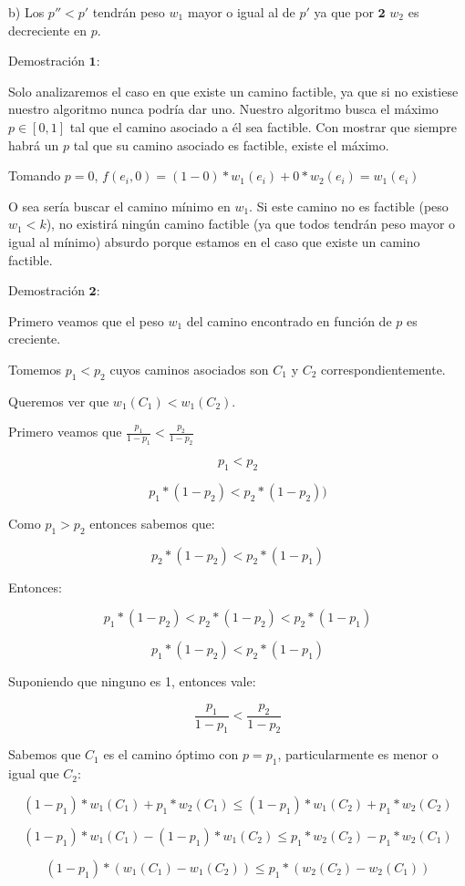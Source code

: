 b) Los $p'' < p'$ tendrán peso $w_1$ mayor o igual al de $p'$ ya que por $\mathbf{2}$ $w_2$ es decreciente en $p$.


Demostraci\'on $\mathbf{1}:$

Solo analizaremos el caso en que existe un camino factible, ya que si no existiese nuestro algoritmo nunca podr\'ia dar uno.
Nuestro algoritmo busca el m\'aximo $p \in [0,1]$ tal que el camino asociado a \'el sea factible. Con mostrar que siempre habrá un $p$ tal que su camino asociado es factible, existe el m\'aximo.

Tomando $p=0$, $f(e_i,0) = (1-0)*w_1(e_i) + 0*w_2(e_i) = w_1(e_i)$

O sea ser\'ia buscar el camino m\'inimo en $w_1$. Si este camino no es factible (peso $w_1 < k$), no existirá ningún camino factible (ya que todos tendrán peso mayor o igual al m\'inimo) absurdo porque estamos en el caso que existe un camino factible.

Demostraci\'on $\mathbf{2}:$

Primero veamos que el peso $w_1$ del camino encontrado en función de $p$ es creciente.

Tomemos $p_1 < p_2$ cuyos caminos asociados son $C_1$ y $C_2$ correspondientemente.

Queremos ver que $w_1(C_1) < w_1(C_2)$.

Primero veamos que $\frac{p_1}{1-p_1} < \frac{p_2}{1-p_2}$

$$ p_1 < p_2 $$

$$ p_1* (1-p_2) < p_2 * (1-p_2))$$

Como $p_1 > p_2$ entonces sabemos que:

$$p_2 * (1-p_2) < p_2 * (1-p_1)$$

Entonces:

$$ p_1* (1-p_2) < p_2 * (1-p_2) < p_2 * (1-p_1)$$

$$ p_1 * (1-p_2) < p_2 * (1-p_1)$$

Suponiendo que ninguno es 1, entonces vale:

$$ \frac{p_1}{1-p_1} < \frac{p_2}{1-p_2} $$ 


Sabemos que $C_1$ es el camino óptimo con $p=p_1$, particularmente es menor o igual que $C_2$:

$$(1-p_1)*w_1(C_1) + p_1*w_2(C_1) \leq (1-p_1)*w_1(C_2) + p_1*w_2(C_2) $$

$$(1-p_1)*w_1(C_1) - (1-p_1)*w_1(C_2) \leq  p_1*w_2(C_2) - p_1*w_2(C_1) $$

$$(1-p_1)*(w_1(C_1) - w_1(C_2)) \leq  p_1*(w_2(C_2) - w_2(C_1)) $$

